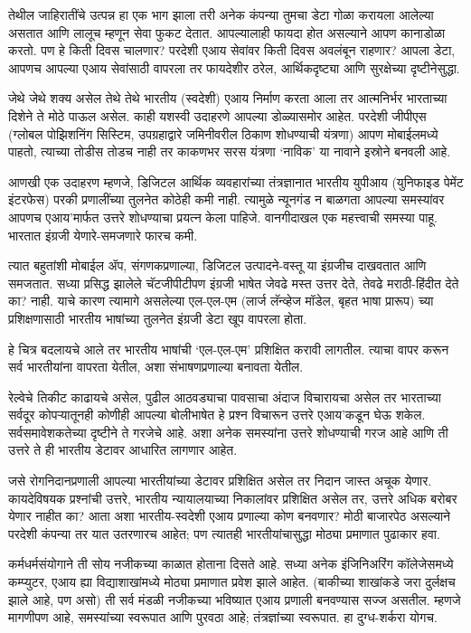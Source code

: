 तेथील जाहिरातींचे उत्पन्न हा एक भाग झाला तरी अनेक कंपन्या तुमचा डेटा गोळा करायला आलेल्या असतात आणि लालूच म्हणून सेवा फुकट देतात. आपल्यालाही फायदा होत असल्याने आपण कानाडोळा करतो. पण हे किती दिवस चालणार? परदेशी एआय सेवांवर किती दिवस अवलंबून राहणार? आपला डेटा, आपणच आपल्या एआय सेवांसाठी वापरला तर फायदेशीर ठरेल, आर्थिकदृष्ट्या आणि सुरक्षेच्या दृष्टीनेसुद्धा.

जेथे जेथे शक्य असेल तेथे तेथे भारतीय (स्वदेशी) एआय निर्माण करता आला तर आत्मनिर्भर भारताच्या दिशेने ते मोठे पाऊल असेल. काही यशस्वी उदाहरणे आपल्या डोळ्यासमोर आहेत. परदेशी जीपीएस (ग्लोबल पोझिशनिंग सिस्टिम, उपग्रहाद्वारे जमिनीवरील ठिकाण शोधण्याची यंत्रणा) आपण मोबाईलमध्ये पाहतो, त्याच्या तोडीस तोडच नाही तर काकणभर सरस यंत्रणा `नाविक' या नावाने इस्रोने बनवली आहे.

आणखी एक उदाहरण म्हणजे, डिजिटल आर्थिक व्यवहारांच्या तंत्रज्ञानात भारतीय युपीआय (युनिफाइड पेमेंट इंटरफेस) परकी प्रणालींच्या तुलनेत कोठेही कमी नाही. त्यामुळे न्यूनगंड न बाळगता आपल्या समस्यांवर आपणच एआय'मार्फत उत्तरे शोधण्याचा प्रयत्न केला पाहिजे. वानगीदाखल एक महत्त्वाची समस्या पाहू. भारतात इंग्रजी येणारे-समजणारे फारच कमी.

त्यात बहुतांशी मोबाईल ॲप, संगणकप्रणाल्या, डिजिटल उत्पादने-वस्तू या इंग्रजीच दाखवतात आणि समजतात. सध्या प्रसिद्ध झालेले चॅटजीपीटीपण इंग्रजी भाषेत जेवढे मस्त उत्तर देते, तेवढे मराठी-हिंदीत देते का? नाही. याचे कारण त्यामागे असलेल्या एल-एल-एम (लार्ज लॅन्व्हेज मॉडेल, बृहत भाषा प्रारूप) च्या प्रशिक्षणासाठी भारतीय भाषांच्या तुलनेत इंग्रजी डेटा खूप वापरला होता.

हे चित्र बदलायचे आले तर भारतीय भाषांची `एल-एल-एम' प्रशिक्षित करावी लागतील. त्याचा वापर करून सर्व भारतीयांना वापरता येतील, अशा संभाषणप्रणाल्या बनावता येतील.

रेल्वेचे तिकीट काढायचे असेल, पुढील आठवड्याचा पावसाचा अंदाज विचारायचा असेल तर भारताच्या सर्वदूर कोपऱ्यातूनही कोणीही आपल्या बोलीभाषेत हे प्रश्न विचारून उत्तरे एआय'कडून घेऊ शकेल. सर्वसमावेशकतेच्या दृष्टीने ते गरजेचे आहे. अशा अनेक समस्यांना उत्तरे शोधण्याची गरज आहे आणि ती उत्तरे ते ही भारतीय डेटावर आधारित लागणार आहेत.

जसे रोगनिदानप्रणाली आपल्या भारतीयांच्या डेटावर प्रशिक्षित असेल तर निदान जास्त अचूक येणार. कायदेविषयक प्रश्नांची उत्तरे, भारतीय न्यायालयाच्या निकालांवर प्रशिक्षित असेल तर, उत्तरे अधिक बरोबर येणार नाहीत का? आता अशा भारतीय-स्वदेशी एआय प्रणाल्या कोण बनवणार? मोठी बाजारपेठ असल्याने परदेशी कंपन्या तर यात उतरणारच आहेत; पण त्यातही भारतीयांचासुद्धा मोठ्या प्रमाणात पुढाकार हवा.

कर्मधर्मसंयोगाने ती सोय नजीकच्या काळात होताना दिसते आहे. सध्या अनेक इंजिनिअरिंग कॉलेजेसमध्ये कम्प्युटर, एआय ह्या विद्याशाखांमध्ये मोठ्या प्रमाणात प्रवेश झाले आहेत. (बाकीच्या शाखांकडे जरा दुर्लक्षच झाले आहे, पण असो) ती सर्व मंडळी नजीकच्या भविष्यात एआय प्रणाली बनवण्यास सज्ज असतील. म्हणजे मागणीपण आहे, समस्यांच्या स्वरूपात आणि पुरवठा आहे; तंत्रज्ञांच्या स्वरूपात. हा दुग्ध-शर्करा योगच.

